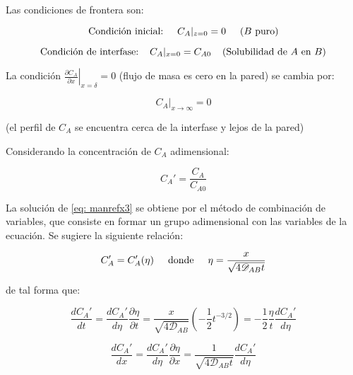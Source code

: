 Las condiciones de frontera son:

\begin{equation}
	\text{Condición inicial:} \hspace{0.5cm} C_A|_{z=0} = 0 \hspace{0.5cm} \text{($B$ puro)}
\end{equation}

\begin{equation}
	 \text{Condición de interfase:} \hspace{0.4cm} C_A|_{x=0} = C_{A0} \hspace{0.4cm} \text{(Solubilidad de $A$ en $B$)}
\end{equation}

La condición $\left. \frac{\partial C_A}{\partial x} \right|_{x = \delta} = 0$ (flujo de masa es cero en la pared) se cambia por:

\begin{equation}
	C_A|_{x \to \infty} = 0
\end{equation}

(el perfil de $C_A$ se encuentra cerca de la interfase y lejos de la pared)

Considerando la concentración de $C_A$ adimensional:

\begin{equation}
	C_A' = \frac{C_A}{C_{A0}}
\end{equation}

La solución de \eqref{eq: manrefx3} se obtiene por el método de combinación de variables, que consiste en formar un grupo adimensional con las variables de la ecuación. Se sugiere la siguiente relación:

\begin{equation}
	C_A' = C_A'(\eta) \hspace{0.5cm} \text{donde} \hspace{0.5cm} \eta = \frac{x}{\sqrt{4 \mathscr{D}_{AB} t}}
\end{equation}

de tal forma que:

\begin{equation} \label{eq: manrefx4}
	\frac{d C_A'}{dt} = \frac{d C_A'}{d \eta} \frac{\partial \eta}{\partial t} = \frac{x}{\sqrt{4 \mathscr{D}_{AB}}} \left( - \frac{1}{2} t^{-3/2}  \right) = - \frac{1}{2} \frac{\eta}{t} \frac{d C_A'}{d \eta}
\end{equation}

$$\frac{dC_A'}{dx} = \frac{dC_A'}{d \eta} \frac{\partial \eta}{\partial x} = \frac{1}{\sqrt{4 \mathscr{D}_{AB} t}} \frac{dC_A'}{d \eta}$$

